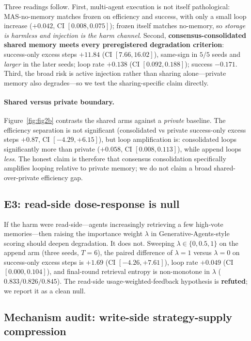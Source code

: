 \documentclass[11pt]{article}
\begin{document}
Three readings follow. First, multi-agent execution is not itself pathological: MAS-no-memory
matches frozen on efficiency and success, with only a small loop increase ($+0.042$,
CI $[0.008, 0.075]$); frozen itself matches no-memory, so \emph{storage is harmless and
injection is the harm channel}. Second, \textbf{consensus-consolidated shared memory meets
every preregistered degradation criterion}: success-only excess steps $+11.84$
(CI $[7.66, 16.02]$), same-sign in $5/5$ seeds and \emph{larger} in the later seeds; loop rate
$+0.138$ (CI $[0.092, 0.188]$); success $-0.171$. Third, the broad risk is active injection
rather than sharing alone---private memory also degrades---so we test the sharing-specific
claim directly.

\paragraph{Shared versus private boundary.} Figure~\ref{fig:fig2b} contrasts the shared arms
against a \emph{private} baseline. The efficiency separation is not significant (consolidated
vs private success-only excess steps $+0.87$, CI $[-4.29, +6.15]$), but loop amplification is:
consolidated loops significantly more than private ($+0.058$, CI $[0.008, 0.113]$), while
append loops \emph{less}. The honest claim is therefore that consensus consolidation
specifically amplifies looping relative to private memory; we do not claim a broad
shared-over-private efficiency gap.

\subsection{E3: read-side dose-response is null}

If the harm were read-side---agents increasingly retrieving a few high-vote memories---then
raising the importance weight $\lambda$ in Generative-Agents-style scoring should deepen
degradation. It does not. Sweeping $\lambda\in\{0,0.5,1\}$ on the append arm (three seeds,
$T{=}6$), the paired difference of $\lambda{=}1$ versus $\lambda{=}0$ on success-only excess
steps is $+1.69$ (CI $[-4.26, +7.61]$), loop rate $+0.049$ (CI $[0.000, 0.104]$), and
final-round retrieval entropy is non-monotone in $\lambda$ ($0.833/0.826/0.845$). The
read-side usage-weighted-feedback hypothesis is \textbf{refuted}; we report it as a clean null.

\subsection{Mechanism audit: write-side strategy-supply compression}
\end{document}
